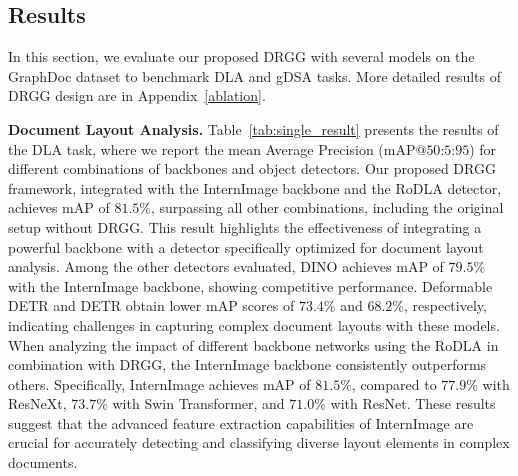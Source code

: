 \subsection{Results}
In this section, we evaluate our proposed DRGG with several models on the GraphDoc dataset to benchmark DLA and gDSA tasks. More detailed  results of DRGG design are in Appendix~\ref{ablation}.

\noindent\textbf{Document Layout Analysis.} Table~\ref{tab:single_result} presents the results of the DLA task, where we report the mean Average Precision (mAP@$50$:$5$:$95$) for different combinations of backbones and object detectors. Our proposed DRGG framework, integrated with the InternImage backbone and the RoDLA detector, achieves mAP of $81.5\%$, surpassing all other combinations, including the original setup without DRGG. This result highlights the effectiveness of integrating a powerful backbone with a detector specifically optimized for document layout analysis. Among the other detectors evaluated, DINO achieves mAP of $79.5\%$ with the InternImage backbone, showing competitive performance. Deformable DETR and DETR obtain lower mAP scores of $73.4\%$ and $68.2\%$, respectively, indicating challenges in capturing complex document layouts with these models. When analyzing the impact of different backbone networks using the RoDLA in combination with DRGG, the InternImage backbone consistently outperforms others. Specifically, InternImage achieves mAP of $81.5\%$, compared to $77.9\%$ with ResNeXt, $73.7\%$ with Swin Transformer, and $71.0\%$ with ResNet. These results suggest that the advanced feature extraction capabilities of InternImage are crucial for accurately detecting and classifying diverse layout elements in complex documents.



